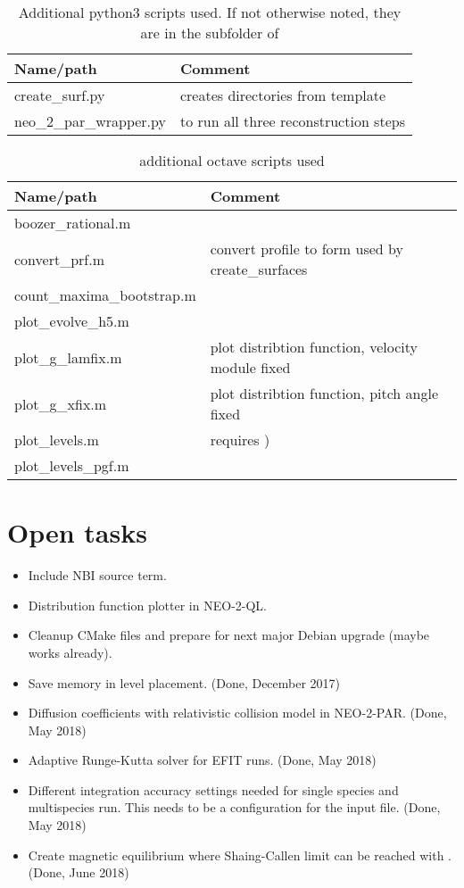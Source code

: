 \documentclass{article}
\newcommand{\vv}[1]{\texttt{\detokenize{#1}}}
\begin{document}
\begin{table}[h]
\centering
\begin{tabular}{l|l}
Name/path   & Comment \\ \hline
create\_surf.py & creates directories from template \\
neo\_2\_par\_wrapper.py & to run all three reconstruction steps
\end{tabular}
\caption{Additional python3 scripts used. If not otherwise noted, they
are in the \vv{PythonScripts/} subfolder of \vv{NEO-2}}
\label{tab:additionalpython3scripts}
\end{table}

\begin{table}[h]
\centering
\begin{tabular}{l|l}
Name/path   & Comment \\ \hline
boozer\_rational.m & \\
convert\_prf.m & convert profile to form used by create\_surfaces \\
count\_maxima\_bootstrap.m & \\
plot\_evolve\_h5.m & \\
plot\_g\_lamfix.m & plot distribtion function, velocity module fixed \\
plot\_g\_xfix.m & plot distribtion function, pitch angle fixed \\
plot\_levels.m & requires \vv{magnetics.h5}) \\
plot\_levels\_pgf.m &
\end{tabular}
\caption{additional octave scripts used}
\label{tab:additionaloctavescripts}
\end{table}

\section{Open tasks}
\begin{itemize}
 \item Include NBI source term.
 \item Distribution function plotter in NEO-2-QL.
 \item Cleanup CMake files and prepare for next major Debian upgrade
 (maybe works already).
 \item Save memory in level placement. (Done, December 2017)
 \item Diffusion coefficients with relativistic collision model in
 NEO-2-PAR. (Done, May 2018)
 \item Adaptive Runge-Kutta solver for EFIT runs. (Done, May 2018)
 \item Different integration accuracy settings needed for single species
 and multispecies run. This needs to be a configuration for the input
 file. (Done, May 2018)
 \item Create magnetic equilibrium where Shaing-Callen limit can be
 reached with \vv{NEO-2}. (Done, June 2018)
\end{itemize}
\end{document}
